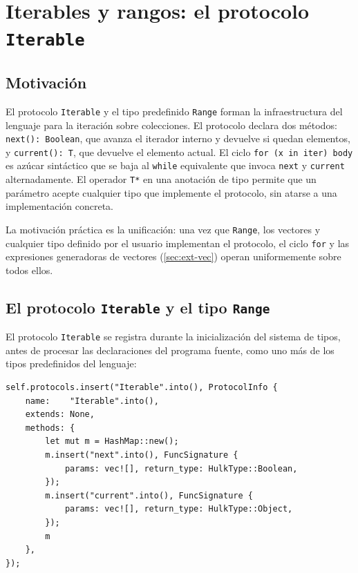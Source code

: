 \documentclass[11pt,a4paper,oneside,openany]{report}
\newcommand{\code}[1]{\texttt{#1}}
\begin{document}
\section{Iterables y rangos: el protocolo \code{Iterable}}
\label{sec:ext-iter}

\subsection{Motivación}

El protocolo \code{Iterable} y el tipo predefinido \code{Range} forman la
infraestructura del lenguaje para la iteración sobre colecciones. El
protocolo declara dos métodos: \code{next(): Boolean}, que avanza el
iterador interno y devuelve si quedan elementos, y \code{current(): T}, que
devuelve el elemento actual. El ciclo \code{for (x in iter) body} es azúcar
sintáctico que se baja al \code{while} equivalente que invoca \code{next} y
\code{current} alternadamente. El operador \code{T*} en una anotación de
tipo permite que un parámetro acepte cualquier tipo que implemente el
protocolo, sin atarse a una implementación concreta.

La motivación práctica es la unificación: una vez que \code{Range}, los
vectores y cualquier tipo definido por el usuario implementan el protocolo,
el ciclo \code{for} y las expresiones generadoras de vectores
(\cref{sec:ext-vec}) operan uniformemente sobre todos ellos.

\subsection{El protocolo \code{Iterable} y el tipo \code{Range}}

El protocolo \code{Iterable} se registra durante la inicialización del
sistema de tipos, antes de procesar las declaraciones del programa fuente,
como uno más de los tipos predefinidos del lenguaje:

\begin{lstlisting}[style=rustst, caption={Registro del protocolo \code{Iterable} como tipo predefinido.}]
self.protocols.insert("Iterable".into(), ProtocolInfo {
    name:    "Iterable".into(),
    extends: None,
    methods: {
        let mut m = HashMap::new();
        m.insert("next".into(), FuncSignature {
            params: vec![], return_type: HulkType::Boolean,
        });
        m.insert("current".into(), FuncSignature {
            params: vec![], return_type: HulkType::Object,
        });
        m
    },
});
\end{lstlisting}
\end{document}
